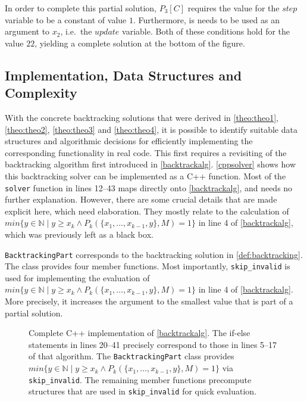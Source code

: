     In order to complete this partial solution, $P_3[C]$ requires the value for
    the $step$ variable to be a constant of value $1$.
    Furthermore, is needs to be used as an argument to $x_2$, i.e.\ the
    $update$ variable.
    Both of these conditions hold for the value $22$, yielding a complete
    solution at the bottom of the figure.

\subsection{Implementation, Data Structures and Complexity}
\label{subsec:impl}

    With the concrete backtracking solutions that were derived in
    \autoref{theo:theo1}, \autoref{theo:theo2}, \autoref{theo:theo3} and
    \autoref{theo:theo4}, it is possible to identify suitable data structures
    and algorithmic decisions for efficiently implementing the corresponding
    functionality in real code.
    This first requires a revisiting of the backtracking algorithm first
    introduced in \autoref{backtrackalg}.
    \autoref{cppsolver} shows how this backtracking solver can be implemented as
    a C++ function.
    Most of the \texttt{solver} function in lines 12--43 maps directly onto
    \autoref{backtrackalg}, and needs no further explanation.
    However, there are some crucial details that are made explicit here, which
    need elaboration.
    They mostly relate to the calculation of
    $min\{y\in\mathbb N\mid y\geq x_k\mathrel\land P_k(\{x_1,\dots,x_{k-1},y\},M)=1\}$
    in line 4 of \autoref{backtrackalg}, which was previously left as a black
    box.

    \texttt{BacktrackingPart} corresponds to the backtracking solution in
    \autoref{def:backtracking}.
    The class provides four member functions.
    Most importantly, \texttt{skip\_invalid} is used for implementing the
    evaluation of
    $min\{y\in\mathbb N\mid y\geq x_k\mathrel\land P_k(\{x_1,\dots,x_{k-1},y\},M)=1\}$
    in line 4 of \autoref{backtrackalg}.
    More precisely, it increases the argument to the smallest value that is
    part of a partial solution.

\begin{figure}[p]
    
    \caption{Complete C++ implementation of \autoref{backtrackalg}.
             The if-else statements in lines 20--41 precisely correspond
             to those in lines 5--17 of that algorithm.
             The \texttt{BacktrackingPart} class provides
             $min\{y\in\mathbb N\mid y\geq x_k\mathrel\land P_k(\{x_1,\dots,x_{k-1},y\},M)=1\}$
             via \texttt{skip\_invalid}.
             The remaining member functions precompute structures that
             are used in \texttt{skip\_invalid} for quick evaluation.}
    \label{cppsolver}
\end{figure}

